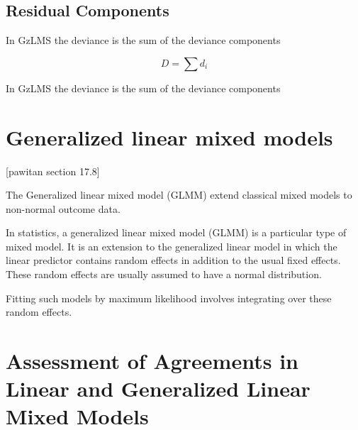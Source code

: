 \documentclass[12pt, a4paper]{report}
\theoremstyle{plain}
\theoremstyle{definition}
\theoremstyle{remark}
\begin{document}
	\subsection{Residual Components}
	In GzLMS the deviance is the sum of the deviance components
	
	\begin{equation}
	D = \sum d_{i}
	\end{equation}
	
	In GzLMS the deviance is the sum of the deviance components
	
	
	\section{Generalized linear mixed models}
	[pawitan section 17.8]
	
	The Generalized linear mixed model (GLMM) extend classical mixed models to non-normal outcome data.
	
	In statistics, a generalized linear mixed model (GLMM) is a particular type of mixed model. It is an extension to the
	generalized linear model in which the linear predictor contains random effects in addition to the usual fixed effects. These random effects are usually assumed to have a normal distribution.
	
	Fitting such models by maximum likelihood involves integrating over these random effects.
	
	
	
	
	\newpage
	
	
	
	
	\section{Assessment of Agreements in Linear and Generalized Linear Mixed Models}
	
\end{document}

